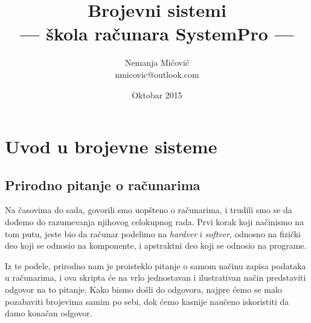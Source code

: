 \documentclass[a4paper]{article}
\begin{document}

\renewcommand\contentsname{Sadržaj}	
\renewcommand{\refname}{Bibliografija}	
\renewcommand{\abstractname}{Abstrakt}

\title{Brojevni sistemi\\ \small{--- škola računara SystemPro --- }}

\author{Nemanja Mićović\\nmicovic@outlook.com}
\date{Oktobar 2015}
\maketitle

\tableofcontents

\newpage

\section{Uvod u brojevne sisteme}
\label{sec:uvod}
\subsection{Prirodno pitanje o računarima}
Na časovima do sada, govorili smo uopšteno o računarima, i trudili smo se da dođemo do razumevanja njihovog celokupnog rada. Prvi korak koji načinismo na tom putu,
jeste bio da računar podelimo na \emph{hardver} i \emph{softver}, odnosno na fizički deo koji se odnosio na komponente, i apstraktni deo koji se odnosio na programe.

Iz te podele, prirodno nam je proisteklo pitanje o samom načinu zapisa podataka u računarima, i ova skripta će na vrlo jednostavan i ilustrativan način predstaviti odgovor na to pitanje.
Kako bismo došli do odgovora, najpre ćemo se malo pozabaviti brojevima samim po sebi, dok ćemo kasnije naučeno iskoristiti da damo konačan odgovor.
\end{document}
